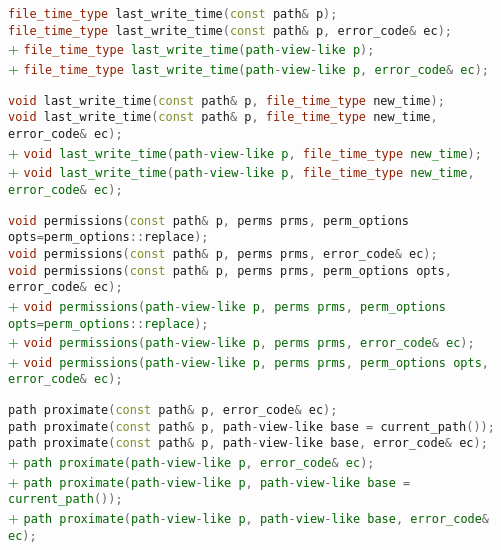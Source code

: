 \documentclass[11pt]{article}
\newcommand{\code}[2][cpp]{\lstinline[language=#1,basicstyle=\small\ttfamily]{#2}}
\newcommand{\tsreplace}[3]{\textcolor{red}{\sout{#1}}#2\textcolor{darkgreen}{#3}}
\begin{document}
\tsreplace{}{  \code{file_time_type last_write_time(const path& p);}}{}\\
\tsreplace{}{  \code{file_time_type last_write_time(const path& p, error_code& ec);}}{}\\
\tsreplace{}{}{+ \code{file_time_type last_write_time(path-view-like p);}}\\
\tsreplace{}{}{+ \code{file_time_type last_write_time(path-view-like p, error_code& ec);}}

\tsreplace{}{  \code{void last_write_time(const path& p, file_time_type new_time);}}{}\\
\tsreplace{}{  \code{void last_write_time(const path& p, file_time_type new_time, error_code& ec);}}{}\\
\tsreplace{}{}{+ \code{void last_write_time(path-view-like p, file_time_type new_time);}}\\
\tsreplace{}{}{+ \code{void last_write_time(path-view-like p, file_time_type new_time, error_code& ec);}}

\tsreplace{}{  \code{void permissions(const path& p, perms prms, perm_options opts=perm_options::replace);}}{}\\
\tsreplace{}{  \code{void permissions(const path& p, perms prms, error_code& ec);}}{}\\
\tsreplace{}{  \code{void permissions(const path& p, perms prms, perm_options opts,  error_code& ec);}}{}\\
\tsreplace{}{}{+ \code{void permissions(path-view-like p, perms prms, perm_options opts=perm_options::replace);}}\\
\tsreplace{}{}{+ \code{void permissions(path-view-like p, perms prms, error_code& ec);}}\\
\tsreplace{}{}{+ \code{void permissions(path-view-like p, perms prms, perm_options opts,  error_code& ec);}}

\tsreplace{}{  \code{path proximate(const path& p, error_code& ec);}}{}\\
\tsreplace{}{  \code{path proximate(const path& p, path-view-like base = current_path());}}{}\\
\tsreplace{}{  \code{path proximate(const path& p, path-view-like base, error_code& ec);}}{}\\
\tsreplace{}{}{+ \code{path proximate(path-view-like p, error_code& ec);}}\\
\tsreplace{}{}{+ \code{path proximate(path-view-like p, path-view-like base = current_path());}}\\
\tsreplace{}{}{+ \code{path proximate(path-view-like p, path-view-like base, error_code& ec);}}
\end{document}
